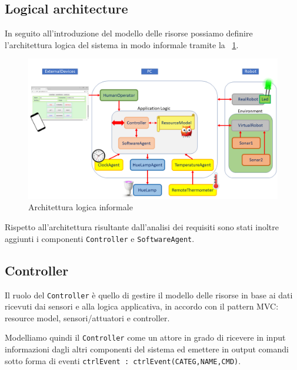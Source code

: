 \documentclass{../llncs}
\newcommand{\codescript}[1]{{\mbox{\small{\texttt{#1}}}}\xspace}
\newcommand{\labelfig}[1]{\label{fig:#1}}
\newcommand{\xf}[1]{\figurename~\ref{fig:#1}}
\begin{document}


\subsection{Logical architecture}
In seguito all'introduzione del modello delle risorse possiamo definire l'architettura logica del sistema in modo informale tramite la \xf{informalLA}.

\begin{figure}[!htb]
\centering
\includegraphics[scale=0.4]{img/informalArchitecture2.png}
\caption{Architettura logica informale}\labelfig{informalLA}
\end{figure}

Rispetto all'architettura risultante dall'analisi dei requisiti sono stati inoltre aggiunti i componenti \texttt{Controller} e \texttt{SoftwareAgent}.

\subsection{Controller}
Il ruolo del \texttt{Controller} è quello di gestire il modello delle risorse in base ai dati ricevuti dai sensori e alla logica applicativa, in accordo con il pattern MVC: resource model, sensori/attuatori e controller.

Modelliamo quindi il \texttt{Controller} come un attore in grado di ricevere in input informazioni dagli altri componenti del sistema ed emettere in output comandi sotto forma di eventi \codescript{ctrlEvent : ctrlEvent(CATEG,NAME,CMD)}.\\


\end{document}
